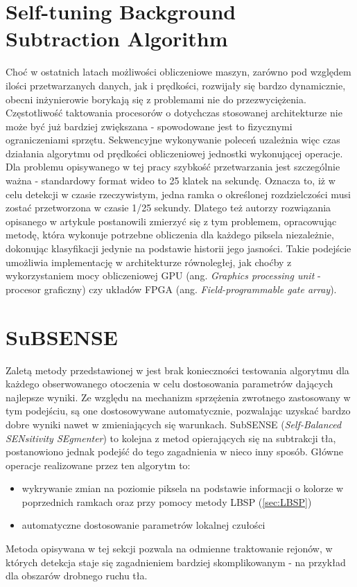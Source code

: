 \section{Self-tuning Background Subtraction Algorithm}
\label{sec:BinWang}
Choć w ostatnich latach możliwości obliczeniowe maszyn, zarówno pod względem ilości przetwarzanych danych, jak i prędkości, rozwijały się bardzo dynamicznie, obecni inżynierowie borykają się z problemami nie do przezwyciężenia. Częstotliwość taktowania procesorów o dotychczas stosowanej architekturze nie może być już bardziej zwiększana - spowodowane jest to fizycznymi ograniczeniami sprzętu. Sekwencyjne wykonywanie poleceń uzależnia więc czas działania algorytmu od prędkości obliczeniowej jednostki wykonującej operacje. Dla problemu opisywanego w tej pracy szybkość przetwarzania jest szczególnie ważna - standardowy format wideo to 25 klatek na sekundę. Oznacza to, iż w celu detekcji w czasie rzeczywistym, jedna ramka o określonej rozdzielczości musi zostać przetworzona w czasie 1/25 sekundy. Dlatego też autorzy rozwiązania opisanego w artykule \cite{6910012} postanowili zmierzyć się z tym problemem, opracowując metodę, która wykonuje potrzebne obliczenia dla każdego piksela niezależnie, dokonując klasyfikacji jedynie na podstawie historii jego jasności. Takie podejście umożliwia implementację w architekturze równoległej, jak choćby z wykorzystaniem mocy obliczeniowej GPU (ang. \textit{Graphics processing unit} - procesor graficzny) czy układów FPGA (ang. \textit{Field-programmable gate array}).

\section{SuBSENSE}
Zaletą metody przedstawionej w \cite{stflexible} jest brak konieczności testowania algorytmu dla każdego obserwowanego otoczenia w celu dostosowania parametrów dających najlepsze wyniki. Ze względu na mechanizm sprzężenia zwrotnego zastosowany w tym podejściu, są one dostosowywane automatycznie, pozwalając uzyskać bardzo dobre wyniki nawet w zmieniających się warunkach. SubSENSE (\textit{Self-Balanced SENsitivity SEgmenter}) to kolejna z metod opierających się na subtrakcji tła, postanowiono jednak podejść do tego zagadnienia w nieco inny sposób. Główne operacje realizowane przez ten algorytm to:
\begin{itemize}
\item wykrywanie zmian na poziomie piksela na podstawie informacji o kolorze w poprzednich ramkach oraz przy pomocy metody LBSP (\ref{sec:LBSP})
\item automatyczne dostosowanie parametrów lokalnej czułości
\end{itemize}
Metoda opisywana w tej sekcji pozwala na odmienne traktowanie rejonów, w których detekcja staje się zagadnieniem bardziej skomplikowanym - na przykład dla obszarów drobnego ruchu tła. 
